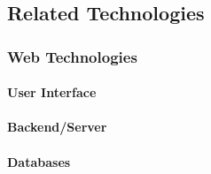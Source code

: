 \subsection{Related Technologies}\label{sec:technology}
\subsubsection{Web Technologies}
\paragraph{User Interface}
\paragraph{Backend/Server}
\paragraph{Databases}